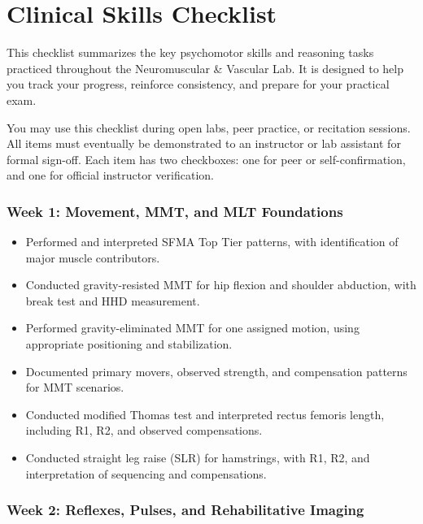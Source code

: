 \chapter{Clinical Skills Checklist}\label{chp:skills_checklist}


This checklist summarizes the key psychomotor skills and reasoning tasks practiced throughout the Neuromuscular \& Vascular Lab. It is designed to help you track your progress, reinforce consistency, and prepare for your practical exam.

You may use this checklist during open labs, peer practice, or recitation sessions. All items must eventually be demonstrated to an instructor or lab assistant for formal sign-off. Each item has two checkboxes: one for peer or self-confirmation, and one for official instructor verification.

\subsection*{Week 1: Movement, MMT, and MLT Foundations}

\begin{itemize}
  \item [$\square$] Performed and interpreted SFMA Top Tier patterns, with identification of major muscle contributors.
  \item [$\square$] Conducted gravity-resisted MMT for hip flexion and shoulder abduction, with break test and HHD measurement.
  \item [$\square$] Performed gravity-eliminated MMT for one assigned motion, using appropriate positioning and stabilization.
  \item [$\square$] Documented primary movers, observed strength, and compensation patterns for MMT scenarios.
  \item [$\square$] Conducted modified Thomas test and interpreted rectus femoris length, including R1, R2, and observed compensations.
  \item [$\square$] Conducted straight leg raise (SLR) for hamstrings, with R1, R2, and interpretation of sequencing and compensations.
\end{itemize}

\subsection*{Week 2: Reflexes, Pulses, and Rehabilitative Imaging}

